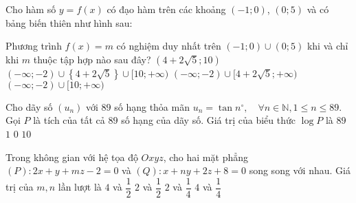 \begin{ex}%
	Cho hàm số $y=f(x)$ có đạo hàm trên các khoảng $(-1;0)$, $(0;5)$ và có bảng biến thiên như hình sau: 
	\begin{center}
	\end{center}
	Phương trình $f(x)=m$ có nghiệm duy nhất trên $(-1;0)\cup (0;5)$ khi và chỉ khi $m$ thuộc tập hợp nào sau đây?
	\choice
	{$(4+2\sqrt{5};10)$}
	{\True $(-\infty;-2)\cup\left\{4+2\sqrt{5}\right\}\cup[10;+\infty)$}
	{$(-\infty;-2)\cup[4+2\sqrt{5};+\infty)$}
	{$(-\infty;-2)\cup[10;+\infty)$}
\end{ex}
\begin{ex}%
	Cho dãy số $(u_n)$ với $89$ số hạng thỏa mãn $u_n=\tan n^{\circ}, \quad \forall n \in \mathbb{N}, 1\leq n \leq 89$. Gọi $P$ là tích của tất cả $89$ số hạng của dãy số. Giá trị của biểu thức $\log P$ là	
	\choice
	{$89$}
	{$1$}
	{\True $0$}
	{$10$}
\end{ex}
\begin{ex}%
		Trong không  gian với hệ tọa độ $Oxyz$, cho hai mặt phẳng $(P)\colon 2x+y+mz-2=0$ và $(Q)\colon x+ny+2z+8=0$ song song với nhau. Giá trị của $m,n$ lần lượt là
	\choice
	{\True $4$ và $\dfrac{1}{2}$}
	{$2$ và $\dfrac{1}{2}$}
	{$2$ và $\dfrac{1}{4}$}
	{$4$ và $\dfrac{1}{4}$}
\end{ex}
